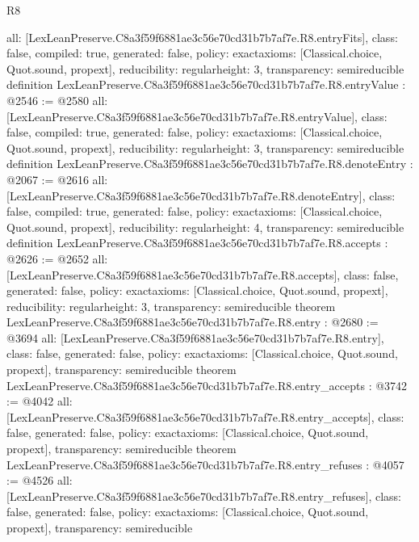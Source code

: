 \begin{lexlean}{R8}
\begin{coremodule}
{  all: [LexLeanPreserve.C8a3f59f6881ae3c56e70cd31b7b7af7e.R8.entryFits],
  class: false,
  compiled: true,
  generated: false,
  policy: exact{axioms: [Classical.choice, Quot.sound, propext]},
  reducibility: regular{height: 3},
  transparency: semireducible
}
definition LexLeanPreserve.C8a3f59f6881ae3c56e70cd31b7b7af7e.R8.entryValue : @2546 := @2580 {
  all: [LexLeanPreserve.C8a3f59f6881ae3c56e70cd31b7b7af7e.R8.entryValue],
  class: false,
  compiled: true,
  generated: false,
  policy: exact{axioms: [Classical.choice, Quot.sound, propext]},
  reducibility: regular{height: 3},
  transparency: semireducible
}
definition LexLeanPreserve.C8a3f59f6881ae3c56e70cd31b7b7af7e.R8.denoteEntry : @2067 := @2616 {
  all: [LexLeanPreserve.C8a3f59f6881ae3c56e70cd31b7b7af7e.R8.denoteEntry],
  class: false,
  compiled: true,
  generated: false,
  policy: exact{axioms: [Classical.choice, Quot.sound, propext]},
  reducibility: regular{height: 4},
  transparency: semireducible
}
definition LexLeanPreserve.C8a3f59f6881ae3c56e70cd31b7b7af7e.R8.accepts : @2626 := @2652 {
  all: [LexLeanPreserve.C8a3f59f6881ae3c56e70cd31b7b7af7e.R8.accepts],
  class: false,
  generated: false,
  policy: exact{axioms: [Classical.choice, Quot.sound, propext]},
  reducibility: regular{height: 3},
  transparency: semireducible
}
theorem LexLeanPreserve.C8a3f59f6881ae3c56e70cd31b7b7af7e.R8.entry : @2680 := @3694 {
  all: [LexLeanPreserve.C8a3f59f6881ae3c56e70cd31b7b7af7e.R8.entry],
  class: false,
  generated: false,
  policy: exact{axioms: [Classical.choice, Quot.sound, propext]},
  transparency: semireducible
}
theorem LexLeanPreserve.C8a3f59f6881ae3c56e70cd31b7b7af7e.R8.entry_accepts : @3742 := @4042 {
  all: [LexLeanPreserve.C8a3f59f6881ae3c56e70cd31b7b7af7e.R8.entry_accepts],
  class: false,
  generated: false,
  policy: exact{axioms: [Classical.choice, Quot.sound, propext]},
  transparency: semireducible
}
theorem LexLeanPreserve.C8a3f59f6881ae3c56e70cd31b7b7af7e.R8.entry_refuses : @4057 := @4526 {
  all: [LexLeanPreserve.C8a3f59f6881ae3c56e70cd31b7b7af7e.R8.entry_refuses],
  class: false,
  generated: false,
  policy: exact{axioms: [Classical.choice, Quot.sound, propext]},
  transparency: semireducible
}


\end{coremodule}
\end{lexlean}
